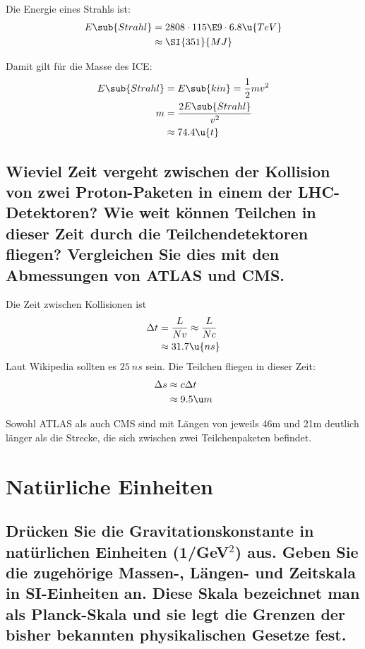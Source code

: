 \documentclass[exb]{exercise_5.0}
\begin{document}
Die Energie eines Strahls ist: 
\begin{align*}
    E\sub{Strahl} &= 2808\cdot 115\E9\cdot 6.8 \u{TeV}\\
    &\approx \SI{351}{MJ}
\end{align*}

Damit gilt für die Masse des ICE:
\begin{align*}
    E\sub{Strahl} &= E\sub{kin} 
    = \frac12 m v^2 \\ 
    m &= \frac{2E\sub{Strahl}}{v^2}\\
    &\approx 74.4\u{t
    }
\end{align*}

\subsection{Wieviel Zeit vergeht zwischen der Kollision von zwei Proton-Paketen in einem der LHC-Detektoren? Wie weit können Teilchen in dieser Zeit durch die Teilchendetektoren fliegen? Vergleichen Sie dies mit den Abmessungen von ATLAS und CMS.}

\dottedlinett

Die Zeit zwischen Kollisionen ist
\begin{align*}
    \Delta t &= \frac{L}{Nv} \approx \frac{L}{Nc} \\
    &\approx 31.7\u{ns}
\end{align*}
Laut Wikipedia sollten es \(\SI{25}{ns}\) sein. Die Teilchen fliegen in dieser Zeit:
\begin{align*}
    \Delta s &\approx c\Delta t\\ 
    &\approx 9.5 \u m 
\end{align*}

Sowohl ATLAS als auch CMS sind mit Längen von jeweils 46m und 21m deutlich länger als die Strecke, die sich zwischen zwei Teilchenpaketen befindet. 

\section{Natürliche Einheiten}
\subsection{Drücken Sie die Gravitationskonstante in natürlichen Einheiten (1/GeV$^2$) aus. Geben Sie die zugehörige Massen-, Längen- und Zeitskala in SI-Einheiten an. Diese Skala bezeichnet man als Planck-Skala und sie legt die Grenzen der bisher bekannten physikalischen Gesetze fest.}
\end{document}
